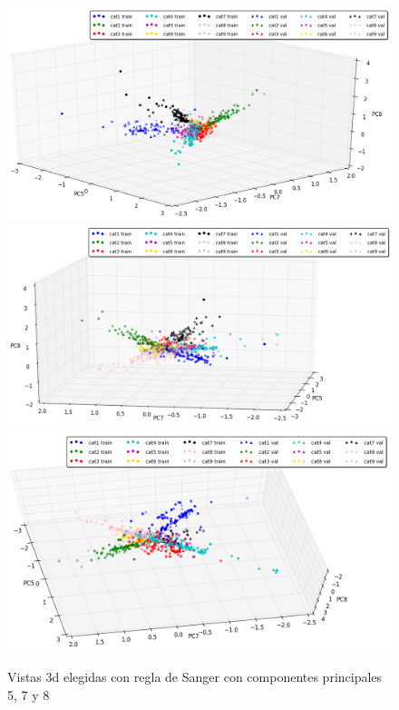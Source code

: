 \begin{figure}[ht!]
	\centering
	\includegraphics[width=0.85\linewidth]{img/parte1-vista3d-sanger-9dim1.png}
	\\
	\includegraphics[width=0.85\linewidth]{img/parte1-vista3d-sanger-9dim2.png}
	\\
	\includegraphics[width=0.85\linewidth]{img/parte1-vista3d-sanger-9dim3.png}
	\caption{Vistas 3d elegidas con regla de Sanger con componentes principales 5, 7 y 8}
\end{figure}

\newpage

